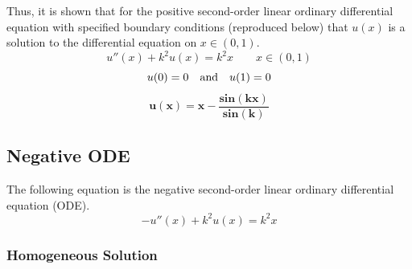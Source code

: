 \documentclass[10pt, reqno]{article}		%
\numberwithin{equation}{section}
\begin{document}
Thus, it is shown that for the positive second-order linear ordinary differential equation with specified boundary conditions (reproduced below) that $u(x)$ is a solution to the differential equation on $x \in (0, 1)$.
\begin{equation}
u''(x)+k^2u(x)=k^2x \qquad x \in (0, 1)
\end{equation}
\begin{equation}
u(0) = 0 \quad \textnormal{and} \quad u(1) = 0 
\end{equation}
\begin{equation}
\mathbf{u(x) = x - \frac{sin(kx)}{sin(k)}}
\end{equation}

\subsection{Negative ODE}

The following equation is the negative second-order linear ordinary differential equation (ODE).
\begin{equation}
-u''(x)+k^2u(x)=k^2x
\end{equation}

\subsubsection{Homogeneous Solution}
\end{document}
